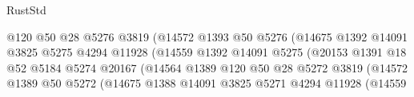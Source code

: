 \begin{lexlean}{RustStd}
\begin{coremodule}
                                            @120
                                            @50
                                            @28
                                            @5276
                                            @3819
                                            (@14572
                                              @1393
                                              @50
                                              @5276
                                              (@14675
                                                @1392
                                                @14091
                                                @3825
                                                @5275
                                                @4294
                                                @11928
                                                (@14559
                                                  @1392
                                                  @14091
                                                  @5275
                                                  (@20153
                                                    @1391
                                                    @18
                                                    @52
                                                    @5184
                                                    @5274
                                                    @20167
                                                    (@14564
                                                      @1389
                                                      @120
                                                      @50
                                                      @28
                                                      @5272
                                                      @3819
                                                      (@14572
                                                        @1389
                                                        @50
                                                        @5272
                                                        (@14675
                                                          @1388
                                                          @14091
                                                          @3825
                                                          @5271
                                                          @4294
                                                          @11928
                                                          (@14559

\end{coremodule}
\end{lexlean}

